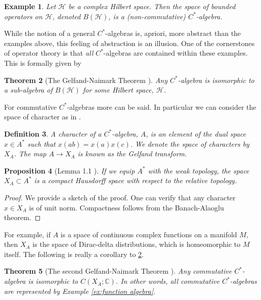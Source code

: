 \documentclass[final,leqno]{siamltex1213}
\newtheorem{thm}{Theorem}[section]
\newtheorem{prop}[thm]{Proposition}
\newtheorem{defn}[thm]{Definition}
\newtheorem{example}[thm]{Example}
\begin{document}
\begin{example}
	Let $\mathcal{H}$ be a complex Hilbert space. Then the space of bounded operators on $\mathcal{H}$, denoted $B(\mathcal{H})$, is a (non-commutative) $C^{*}$-algebra.
\end{example}

While the notion of a general $C^{*}$-algebras is, apriori, more abstract than the examples above, this feeling of abstraction is an illusion.
One of the cornerstones of operator theory is that \emph{all} $C^{*}$-algebras are contained within these examples.
This is formally given by

\begin{thm}[The Gelfand-Naimark Theorem \cite{GelfandNaimark1943}] \label{thm:GN1}
	Any $C^{*}$-algebra is isomorphic to a sub-algebra of $B(\mathcal{H})$ for some Hilbert space, $\mathcal{H}$.
\end{thm}

For commutative $C^{*}$-algebras more can be said.
In particular we can consider the space of character as in \cite{Bondia2001}.

\begin{defn}
	A \emph{character} of a $C^{*}$-algebra, $A$, is an element of the dual space $x \in A^{*}$ such that
	$x(ab) = x(a) x(c)$.  We denote the space of characters by $X_{A}$.
	The map $A \to X_{A}$ is known as the \emph{Gelfand transform}.
\end{defn}

\begin{prop}[Lemma 1.1 \cite{Bondia2001}]
	If we equip $A^{*}$ with the weak topology, the space $X_{A} \subset A^{*}$ is a compact Hausdorff space with respect to the relative topology.
\end{prop}
\begin{proof}
	We provide a sketch of the proof.
	One can verify that any character $x \in X_{A}$ is of unit norm.
	Compactness follows from the Banach-Alaoglu theorem.
\end{proof}

For example, if $A$ is a space of continuous complex functions on a manifold $M$, then $X_{A}$ is the space of Dirac-delta distributions, which is homeomorphic to $M$ itself.
The following is really a corollary to \ref{thm:GN1}.

\begin{thm}[The second Gelfand-Naimark Theorem \cite{GelfandNaimark1943}] \label{thm:GN2}
	Any commutative $C^{*}$-algebra is isomorphic to $C(X_{A} ; \mathbb{C})$.
	In other words, all commutative $C^{*}$-algebras are represented by Example \ref{ex:function algebra}.
\end{thm}
\end{document}
